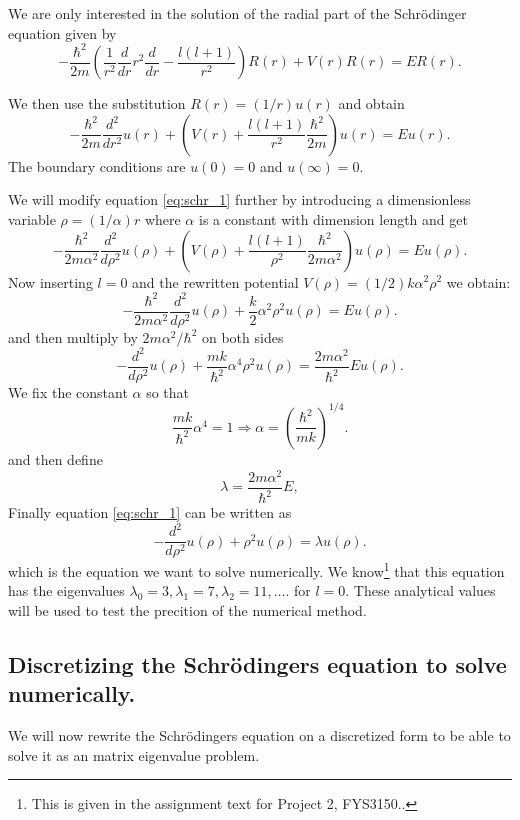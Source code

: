 \documentclass[11pt,a4wide]{article}
\begin{document}
We are only interested in the solution of the radial part of the Schr\"odinger equation given by
\begin{equation}
  -\frac{\hbar^2}{2 m} \left ( \frac{1}{r^2} \frac{d}{dr} r^2
  \frac{d}{dr} - \frac{l (l + 1)}{r^2} \right )R(r) 
     + V(r) R(r) = E R(r).
     \label{eq:schr_1}
\end{equation}

We then use the substitution $R(r) = (1/r) u(r)$ and obtain
\[
  -\frac{\hbar^2}{2 m} \frac{d^2}{dr^2} u(r) 
       + \left ( V(r) + \frac{l (l + 1)}{r^2}\frac{\hbar^2}{2 m}
                                    \right ) u(r)  = E u(r) .
\]
The boundary conditions are $u(0)=0$ and $u(\infty)=0$.

We will modify equation \ref{eq:schr_1} further by introducing a dimensionless variable $\rho = (1/\alpha) r$ where $\alpha$ is a constant with dimension length and get
% 
\[
  -\frac{\hbar^2}{2 m \alpha^2} \frac{d^2}{d\rho^2} u(\rho) 
       + \left ( V(\rho) + \frac{l (l + 1)}{\rho^2}
         \frac{\hbar^2}{2 m\alpha^2} \right ) u(\rho)  = E u(\rho) .
\]
%
Now inserting $l=0$ and the rewritten potential $V(\rho) = (1/2) k \alpha^2\rho^2$ we obtain:
\[
  -\frac{\hbar^2}{2 m \alpha^2} \frac{d^2}{d\rho^2} u(\rho) 
       + \frac{k}{2} \alpha^2\rho^2u(\rho)  = E u(\rho) .
\]
and then multiply by $2m\alpha^2/\hbar^2$ on both sides
\[
  -\frac{d^2}{d\rho^2} u(\rho) 
       + \frac{mk}{\hbar^2} \alpha^4\rho^2u(\rho)  = \frac{2m\alpha^2}{\hbar^2}E u(\rho) .
\]
We fix the constant $\alpha$ so that
\[
\frac{mk}{\hbar^2} \alpha^4 = 1 \Rightarrow \alpha = \left(\frac{\hbar^2}{mk}\right)^{1/4}.
\]
and then define 
\[
\lambda = \frac{2m\alpha^2}{\hbar^2}E,
\]
Finally equation \ref{eq:schr_1} can be written as
\begin{equation}
  -\frac{d^2}{d\rho^2} u(\rho) + \rho^2u(\rho)  = \lambda u(\rho) .
  \label{eq: sch_1D_final}
\end{equation}
which is the equation we want to solve numerically. We know\footnote{This is given in the assignment text for Project 2, FYS3150..} that this equation has the eigenvalues $\lambda_0=3,\lambda_1=7,\lambda_2=11,\dots .$ for $l=0$. These analytical values will be used to test the precition of the numerical method.

\subsection{Discretizing the Schr\"odingers equation to solve numerically.} \label{sec: descrete}
We will now rewrite the Schr\"odingers equation on a discretized form to be able to solve it as an matrix eigenvalue problem.
\end{document}
